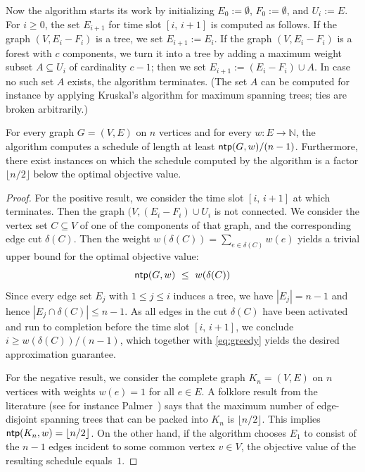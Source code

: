 \documentclass[runningheads]{llncs}
\newcommand{\N}{\mathbb{N}}
\DeclareMathOperator{\ntp}{\text{\sf ntp}}
\newcommand{\greedy}{\text{\sf Greedy}}
\begin{document}
Now the {\greedy} algorithm starts its work by initializing 
$E_0:=\emptyset$, $F_0:=\emptyset$, and $U_i:=E$.
For $i\ge0$, the set $E_{i+1}$ for time slot $[i,\,i+1]$ is computed as follows.
If the graph $(V,E_i-F_i)$ is a tree, we set $E_{i+1}:=E_i$.
If the graph $(V,E_i-F_i)$ is a forest with $c$ components, we turn it into 
a tree by adding a maximum weight subset $A\subseteq U_i$ of cardinality $c-1$;
then we set $E_{i+1}:=(E_i-F_i)\cup A$.
In case no such set $A$ exists, the {\greedy} algorithm terminates.
(The set $A$ can be computed for instance by applying Kruskal's algorithm for 
maximum spanning trees; ties are broken arbitrarily.)

\begin{theorem}
\label{th:greedy.approx}
For every graph $G=(V,E)$ on $n$ vertices and for every $w:E\to\N$, 
the {\greedy} algorithm computes a schedule of length at least $\ntp(G,w)/(n-1)$.
Furthermore, there exist instances on which the schedule computed by the 
{\greedy} algorithm is a factor $\lfloor n/2\rfloor$ below the optimal objective value.
\end{theorem}
\begin{proof}
For the positive result, we consider the time slot $[i,\,i+1]$ at which {\greedy} terminates.
Then the graph $(V,(E_i-F_i)\cup U_i$ is not connected.
We consider the vertex set $C\subseteq V$ of one of the components of that graph, and the
corresponding edge cut $\delta(C)$.
Then the weight $w(\delta(C))=\sum_{e\in\delta(C)}w(e)$ yields a trivial upper bound for the 
optimal objective value: 
\begin{equation}
\label{eq:greedy}
\ntp(G,w) ~\le~ w(\delta(C))
\end{equation}
Since every edge set $E_j$ with $1\le j\le i$ induces a tree, we have $|E_j|=n-1$ and hence
$|E_j\cap \delta(C)|\le n-1$.
As all edges in the cut $\delta(C)$ have been activated and run to completion before the 
time slot $[i,\,i+1]$, we conclude $i\ge w(\delta(C))/(n-1)$, which together with \eqref{eq:greedy}
yields the desired approximation guarantee.

For the negative result, we consider the complete graph $K_n=(V,E)$ on $n$ vertices with 
weights $w(e)=1$ for all $e\in E$.
A folklore result from the literature (see for instance Palmer~\cite{Palmer2001}) says that the 
maximum number of edge-disjoint spanning trees that can be packed into $K_n$ is $\lfloor n/2\rfloor$.
This implies $\ntp(K_n,w)=\lfloor n/2\rfloor$.
On the other hand, if the {\greedy} algorithm chooses $E_1$ to consist of the $n-1$ edges incident
to some common vertex $v\in V$, the objective value of the resulting schedule equals~$1$.
\end{proof}
\end{document}
